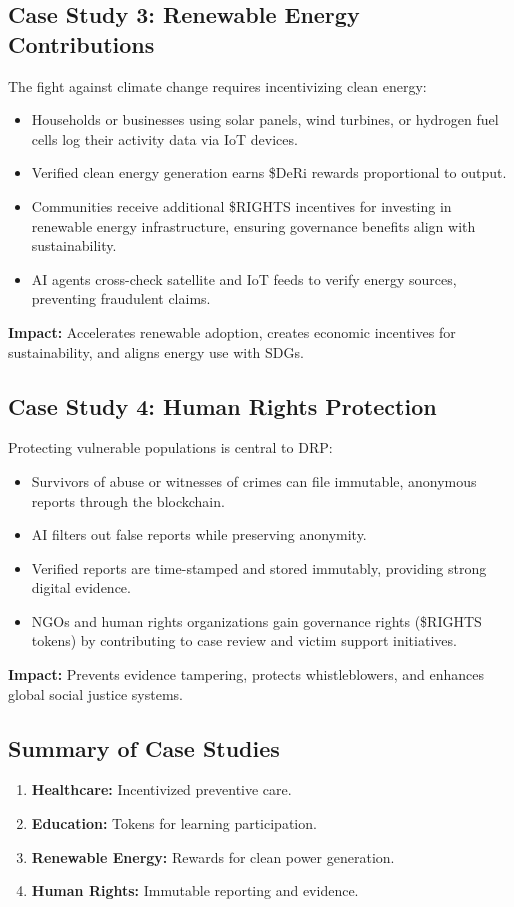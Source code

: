 \documentclass[11pt,a4paper]{article}
\begin{document}
\subsection{Case Study 3: Renewable Energy Contributions}
The fight against climate change requires incentivizing clean energy:
\begin{itemize}
    \item Households or businesses using solar panels, wind turbines, or hydrogen fuel cells log their activity data via IoT devices.  
    \item Verified clean energy generation earns \$DeRi rewards proportional to output.  
    \item Communities receive additional \$RIGHTS incentives for investing in renewable energy infrastructure, ensuring governance benefits align with sustainability.  
    \item AI agents cross-check satellite and IoT feeds to verify energy sources, preventing fraudulent claims.  
\end{itemize}
\textbf{Impact:} Accelerates renewable adoption, creates economic incentives for sustainability, and aligns energy use with SDGs.

\subsection{Case Study 4: Human Rights Protection}
Protecting vulnerable populations is central to DRP:
\begin{itemize}
    \item Survivors of abuse or witnesses of crimes can file immutable, anonymous reports through the blockchain.  
    \item AI filters out false reports while preserving anonymity.  
    \item Verified reports are time-stamped and stored immutably, providing strong digital evidence.  
    \item NGOs and human rights organizations gain governance rights (\$RIGHTS tokens) by contributing to case review and victim support initiatives.  
\end{itemize}
\textbf{Impact:} Prevents evidence tampering, protects whistleblowers, and enhances global social justice systems.

\subsection{Summary of Case Studies}
\begin{enumerate}
    \item \textbf{Healthcare:} Incentivized preventive care.  
    \item \textbf{Education:} Tokens for learning participation.  
    \item \textbf{Renewable Energy:} Rewards for clean power generation.  
    \item \textbf{Human Rights:} Immutable reporting and evidence.  
\end{enumerate}
\end{document}
